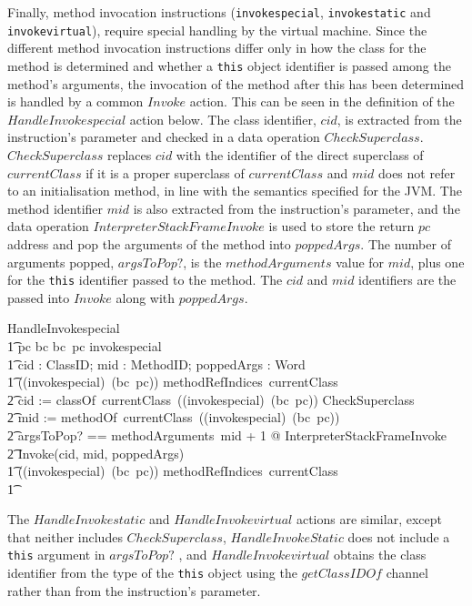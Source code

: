 Finally, method invocation instructions (\texttt{invokespecial},
\texttt{invokestatic} and \texttt{invokevirtual}), require special
handling by the virtual machine.
Since the different method invocation instructions differ only in how
the class for the method is determined and whether a \texttt{this}
object identifier is passed among the method's arguments, the
invocation of the method after this has been determined is handled by
a common $Invoke$ action.
This can be seen in the definition of the $HandleInvokespecial$ action
below.
The class identifier, $cid$, is extracted from the instruction's
parameter and checked in a data operation $CheckSuperclass$.
$CheckSuperclass$ replaces $cid$ with the identifier of the direct
superclass of $currentClass$ if it is a proper superclass of
$currentClass$ and $mid$ does not refer to an initialisation method,
in line with the semantics specified for the JVM. 
The method identifier $mid$ is also extracted from the instruction's
parameter, and the data operation $InterpreterStackFrameInvoke$ is
used to store the return $pc$ address and pop the arguments of the
method into $poppedArgs$.
The number of arguments popped, $argsToPop?$, is the $methodArguments$
value for $mid$, plus one for the \texttt{this} identifier passed to
the method.
The $cid$ and $mid$ identifiers are the passed into $Invoke$ along
with $poppedArgs$.
\begin{circusaction}
  HandleInvokespecial \circdef \\
  \t1 \lcircguard pc \in \dom bc \land bc~pc \in \ran invokespecial \rcircguard \circguard \\
  \t1 \circvar cid : ClassID; mid : MethodID; poppedArgs : \seq Word \circspot \\
  \t1 \circif ((invokespecial\inv)~(bc~pc)) \in methodRefIndices~currentClass \circthen {} \\
  \t2 cid := classOf~currentClass~((invokespecial\inv)~(bc~pc)) \circseq \lschexpract CheckSuperclass \rschexpract \circseq \\
  \t2 mid := methodOf~currentClass~((invokespecial\inv)~(bc~pc)) \circseq \\
  \t2 \lschexpract \exists argsToPop? == methodArguments~mid + 1 @ InterpreterStackFrameInvoke \rschexpract \circseq \\
  \t2 Invoke(cid, mid, poppedArgs) \\
  \t1 {} \circelse ((invokespecial\inv)~(bc~pc)) \notin methodRefIndices~currentClass \circthen \Chaos \\
  \t1 \circfi
\end{circusaction}
The $HandleInvokestatic$ and $HandleInvokevirtual$ actions are
similar, except that neither includes $CheckSuperclass$,
$HandleInvokeStatic$ does not include a \texttt{this} argument in
$argsToPop?$ , and $HandleInvokevirtual$ obtains the class identifier
from the type of the \texttt{this} object using the $getClassIDOf$
channel rather than from the instruction's parameter.

